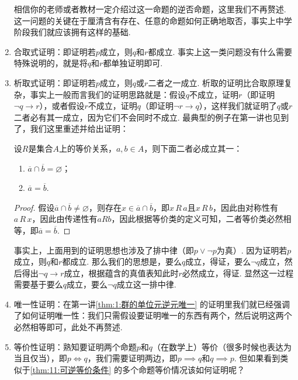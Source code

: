 \begin{enumerate}
          相信你的老师或者教材一定介绍过这一命题的逆否命题，这里我们不再赘述. 这一问题的关键在于厘清含有存在、任意的命题如何正确地取否，事实上中学阶段我们就应该拥有这样的基础.

    \item 合取式证明：即证明若$p$成立，则$q$和$r$都成立. 事实上这一类问题没有什么需要特殊说明的，就是将$q$和$r$都单独证明即可.

    \item 析取式证明：即证明若$p$成立，则$q$或$r$二者之一成立. 析取的证明比合取原理复杂，事实上一般而言我们的证明思路就是：假设$q$不成立，证明$r$（即证明$\lnot q\to r$），或者假设$r$不成立，证明$q$（即证明$\lnot r\to q$），这样我们就证明了$q$或$r$二者必有其一成立，因为它们不会同时不成立. 最典型的例子在第一讲也见到了，我们这里重述并给出证明：
          \begin{theorem}
              设$R$是集合$A$上的等价关系，$a,b\in A$，则下面二者必成立其一：
              \begin{enumerate}
                  \item $\overline{a}\cap\overline{b}=\varnothing$；

                  \item $\overline{a}=\overline{b}$.
              \end{enumerate}
          \end{theorem}
          \begin{proof}
              假设$\overline{a}\cap\overline{b}\neq\varnothing$，则存在$x\in\overline{a}\cap\overline{b}$，即$x\,R\,a$且$x\,R\,b$，因此由对称性有$a\,R\,x$，因此由传递性有$aRb$，因此根据等价类的定义可知，二者等价类必然相等，即$\overline{a}=\overline{b}$.
          \end{proof}

          事实上，上面用到的证明思想也涉及了排中律（即$p\lor\lnot p$为真）. 因为证明若$p$成立，则$q$和$r$都成立. 那么我们的思想是，要么$q$成立，得证，要么$\lnot q$成立，然后得出$\lnot q\to r$成立，根据蕴含的真值表知此时$r$必然成立，得证. 显然这一过程需要基于要么$q$成立，要么$\lnot q$成立这一排中律.

    \item 唯一性证明：在第一讲\autoref{thm:1:群的单位元逆元唯一} 的证明里我们就已经强调了如何证明唯一性：我们只需假设要证明唯一的东西有两个，然后说明这两个必然相等即可，此处不再赘述.

    \item 等价性证明：熟知要证明两个命题$p$和$q$（在数学上）等价（很多时候也表达为当且仅当），即$p\iff q$，我们需要证明两边，即$p\implies q$和$q\implies p$. 但如果看到类似于\autoref{thm:11:可逆等价条件} 的多个命题等价情况该如何证明呢？


\end{enumerate}
